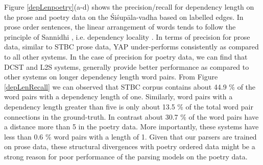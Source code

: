 \documentclass[11pt]{article}
\begin{document}
    
Figure \ref{depLenpoetry}(a-d) shows the precision/recall for dependency length on the prose and poetry data on  the Śiśupāla-vadha based on labelled edges. In prose order sentences, the linear arrangement of words tends to follow the principle of Sannidhi \cite{Ambakulkarni2015}, i.e. dependency locality \cite{GIBSON2019389}. In terms of precision for prose data, similar to STBC prose data, YAP under-performs consistently as compared to all other systems. In the case of precision for poetry data, we can find that DCST and L2S systems, generally provide better performance as compared to other systems on longer dependency length word pairs.  From Figure \ref{depLenRecall} we can observed that STBC corpus contains about 44.9 \% of the word pairs with a dependency length of one. Similarly, word pairs with a dependency length greater than five is only about 13.5 \% of the total word pair connections in the ground-truth. In contrast about 30.7 \% of the word pairs have a distance more than 5 in the poetry data. More importantly, these systems have less than 0.6 \% word pairs with a length of 1. Given that our parsers are trained on prose data, these structural divergences with poetry ordered data might be a strong reason for poor performance of the parsing models on the poetry data.
\end{document}
